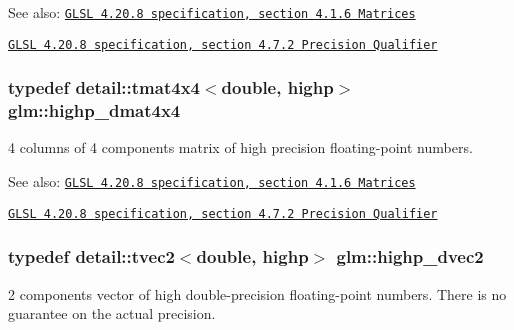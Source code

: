 \begin{Desc}
\item[See also:]\href{http://www.opengl.org/registry/doc/GLSLangSpec.4.20.8.pdf}{\tt GLSL 4.20.8 specification, section 4.1.6 Matrices} 

\href{http://www.opengl.org/registry/doc/GLSLangSpec.4.20.8.pdf}{\tt GLSL 4.20.8 specification, section 4.7.2 Precision Qualifier} \end{Desc}
\hypertarget{group__core__precision_g1c0a2edbde597b59e9005691a224b208}{
\subsubsection[highp\_\-dmat4x4]{\setlength{\rightskip}{0pt plus 5cm}typedef detail::tmat4x4$<$double, highp$>$ {\bf glm::highp\_\-dmat4x4}}}
\label{group__core__precision_g1c0a2edbde597b59e9005691a224b208}


4 columns of 4 components matrix of high precision floating-point numbers.

\begin{Desc}
\item[See also:]\href{http://www.opengl.org/registry/doc/GLSLangSpec.4.20.8.pdf}{\tt GLSL 4.20.8 specification, section 4.1.6 Matrices} 

\href{http://www.opengl.org/registry/doc/GLSLangSpec.4.20.8.pdf}{\tt GLSL 4.20.8 specification, section 4.7.2 Precision Qualifier} \end{Desc}
\hypertarget{group__core__precision_gcfbe8512142fff27f0bfb44958c1752f}{
\subsubsection[highp\_\-dvec2]{\setlength{\rightskip}{0pt plus 5cm}typedef detail::tvec2$<$double, highp$>$ {\bf glm::highp\_\-dvec2}}}
\label{group__core__precision_gcfbe8512142fff27f0bfb44958c1752f}


2 components vector of high double-precision floating-point numbers. There is no guarantee on the actual precision.


